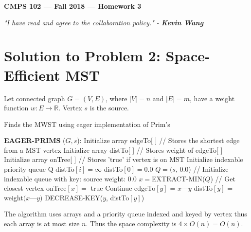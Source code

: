 \documentclass[11pt]{article}
\theoremstyle{definition}
\theoremstyle{plain}
\theoremstyle{indented-remark}
\theoremstyle{indented-proof}
\begin{document}
\begin{center}
{\bf\Large CMPS 102 --- Fall 2018 ---  Homework 3}
\end{center}

\begin{center}
\textit{"I have read and agree to the collaboration policy." - \textbf{Kevin Wang}}
\end{center}

\section*{Solution to Problem 2: Space-Efficient MST}

Let connected graph $G=(V,E)$, where $|V|=n$ and $|E|=m$, have a weight function $w:E \rightarrow \mathbb{R}$. \newline
Vertex $s$ is the source.

\begin{algorithm}
\caption{Finds the MWST using eager implementation of Prim's}
\begin{algorithmic} 
\STATE \textbf{EAGER-PRIMS} ($G,s$):
\STATE Initialize array edgeTo[ ] // Stores the shortest edge from a MST vertex
\STATE Initialize array distTo[ ] // Stores weight of edgeTo[ ]
\STATE Initialize array onTree[ ] // Stores 'true' if vertex is on MST
\STATE Initialize indexable priority queue Q
\STATE distTo$[i]=\infty$
\ENDFOR
\STATE distTo$[0]=0.0$ 
\STATE $Q = (s$, 0.0) // Initialize indexable queue with key: source weight: 0.0
\STATE $x=$EXTRACT-MIN($Q$) // Get closest vertex
\STATE onTree$[x]=$ true
\STATE Continue
\ELSE
{}
\STATE edgeTo$[y]$ = $x$---$y$
\STATE distTo$[y]$ = weight$(x$---$y)$
\STATE DECREASE-KEY($y$, distTo$[y]$)
\ENDIF
\ENDIF
\ENDFOR
\ENDWHILE
\end{algorithmic}
\end{algorithm}

\noindent The algorithm uses arrays and a priority queue indexed and keyed by vertex thus each array is at most size $n$. Thus the space complexity is $4 \times O(n)=O(n)$.
\end{document}
